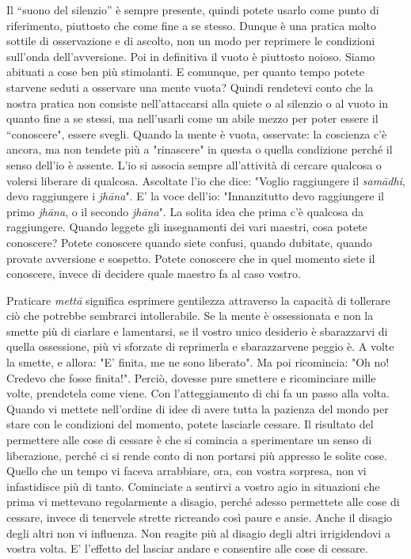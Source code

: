 Il “suono del silenzio” è sempre presente, quindi potete usarlo come
punto di riferimento, piuttosto che come fine a se stesso. Dunque è una
pratica molto sottile di osservazione e di ascolto, non un modo per
reprimere le condizioni sull'onda dell'avversione. Poi in definitiva il
vuoto è piuttosto noioso. Siamo abituati a cose ben più stimolanti. E
comunque, per quanto tempo potete starvene seduti a osservare una mente
vuota? Quindi rendetevi conto che la nostra pratica non consiste
nell'attaccarsi alla quiete o al silenzio o al vuoto in quanto fine a se
stessi, ma nell'usarli come un abile mezzo per poter essere il
“conoscere", essere svegli. Quando la mente è vuota, osservate: la
coscienza c'è ancora, ma non tendete più a "rinascere" in questa o
quella condizione perché il senso dell'io è assente. L'io si associa
sempre all'attività di cercare qualcosa o volersi liberare di qualcosa.
Ascoltate l'io che dice: "Voglio raggiungere il \textit{samādhi}, devo
raggiungere i \textit{jhāna}". E' la voce dell'io: "Innanzitutto devo raggiungere
il primo \textit{jhāna}, o il secondo \textit{jhāna}". La solita idea che prima c'è
qualcosa da raggiungere. Quando leggete gli insegnamenti dei vari
maestri, cosa potete conoscere? Potete conoscere quando siete confusi,
quando dubitate, quando provate avversione e sospetto. Potete conoscere
che in quel momento siete il conoscere, invece di decidere quale maestro
fa al caso vostro.

Praticare \textit{mettā} significa esprimere gentilezza attraverso la capacità di
tollerare ciò che potrebbe sembrarci intollerabile. Se la mente è
ossessionata e non la smette più di ciarlare e lamentarsi, se il vostro
unico desiderio è sbarazzarvi di quella ossessione, più vi sforzate di
reprimerla e sbarazzarvene peggio è. A volte la smette, e allora: "E'
finita, me ne sono liberato". Ma poi ricomincia: "Oh no! Credevo che
fosse finita!". Perciò, dovesse pure smettere e ricominciare mille
volte, prendetela come viene. Con l'atteggiamento di chi fa un passo
alla volta. Quando vi mettete nell'ordine di idee di avere tutta la
pazienza del mondo per stare con le condizioni del momento, potete
lasciarle cessare. Il risultato del permettere alle cose di cessare è
che si comincia a sperimentare un senso di liberazione, perché ci si
rende conto di non portarsi più appresso le solite cose. Quello che un
tempo vi faceva arrabbiare, ora, con vostra sorpresa, non vi
infastidisce più di tanto. Cominciate a sentirvi a vostro agio in
situazioni che prima vi mettevano regolarmente a disagio, perché adesso
permettete alle cose di cessare, invece di tenervele strette ricreando
così paure e ansie. Anche il disagio degli altri non vi influenza. Non
reagite più al disagio degli altri irrigidendovi a vostra volta. E'
l'effetto del lasciar andare e consentire alle cose di cessare.

